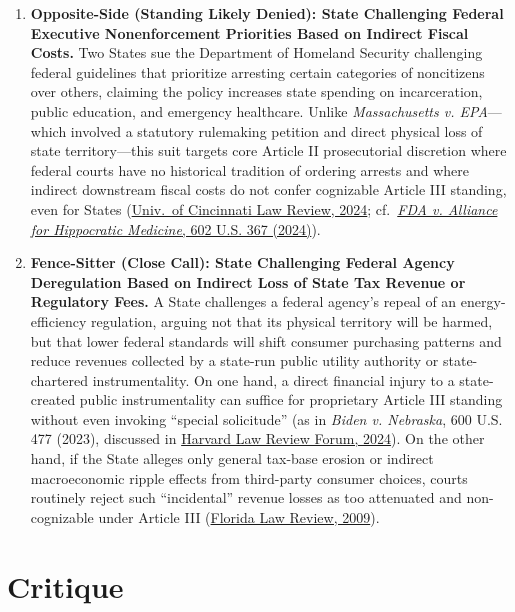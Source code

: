 \documentclass[12pt]{article}
\begin{document}
\begin{enumerate}
    \item \textbf{Opposite-Side (Standing Likely Denied): State Challenging Federal Executive Nonenforcement Priorities Based on Indirect Fiscal Costs.} Two States sue the Department of Homeland Security challenging federal guidelines that prioritize arresting certain categories of noncitizens over others, claiming the policy increases state spending on incarceration, public education, and emergency healthcare. Unlike \textit{Massachusetts v. EPA}---which involved a statutory rulemaking petition and direct physical loss of state territory---this suit targets core Article II prosecutorial discretion where federal courts have no historical tradition of ordering arrests and where indirect downstream fiscal costs do not confer cognizable Article III standing, even for States (\href{https://scholarship.law.uc.edu/cgi/viewcontent.cgi?article=1550&context=uclr}{Univ.\ of Cincinnati Law Review, 2024}; cf.\ \href{https://supreme.justia.com/cases/federal/us/602/23-235/}{\textit{FDA v. Alliance for Hippocratic Medicine}, 602 U.S. 367 (2024)}).

    \item \textbf{Fence-Sitter (Close Call): State Challenging Federal Agency Deregulation Based on Indirect Loss of State Tax Revenue or Regulatory Fees.} A State challenges a federal agency's repeal of an energy-efficiency regulation, arguing not that its physical territory will be harmed, but that lower federal standards will shift consumer purchasing patterns and reduce revenues collected by a state-run public utility authority or state-chartered instrumentality. On one hand, a direct financial injury to a state-created public instrumentality can suffice for proprietary Article III standing without even invoking ``special solicitude'' (as in \textit{Biden v. Nebraska}, 600 U.S. 477 (2023), discussed in \href{https://harvardlawreview.org/forum/vol-137/what-happened-to-traceability/}{Harvard Law Review Forum, 2024}). On the other hand, if the State alleges only general tax-base erosion or indirect macroeconomic ripple effects from third-party consumer choices, courts routinely reject such ``incidental'' revenue losses as too attenuated and non-cognizable under Article III (\href{https://scholarship.law.ufl.edu/cgi/viewcontent.cgi?article=1677&context=flr}{Florida Law Review, 2009}).
\end{enumerate}

\section{Critique}
\end{document}
